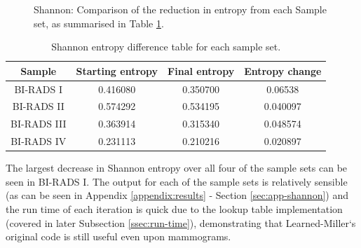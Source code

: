 \begin{figure}[H]
  \begin{center}
    \caption{Shannon: Comparison of the reduction in entropy from each Sample set, as summarised in Table \ref{table:shannon-entropy}.}
    \label{fig:shannon-graph}
  \end{center}
\end{figure}

\begin{table}[H]
  \centering
  \begin{tabular}{| c  c  c   c |}
    \textbf{Sample} & \textbf{Starting entropy} & \textbf{Final entropy} & \textbf{Entropy change} \\ \hline
    BI-RADS I & 0.416080 & 0.350700 & 0.06538 \\ \hline
    BI-RADS II & 0.574292 & 0.534195 & 0.040097 \\ \hline
    BI-RADS III & 0.363914 & 0.315340 & 0.048574 \\ \hline
    BI-RADS IV & 0.231113 & 0.210216 & 0.020897 \\
  \end{tabular}
  \caption{Shannon entropy difference table for each sample set.}
  \label{table:shannon-entropy}
\end{table}

The largest decrease in Shannon entropy over all four of the sample sets can be seen in BI-RADS I. The output for each of the sample sets is relatively sensible (as can be seen in  Appendix \ref{appendix:results} - Section \ref{sec:app-shannon}) and the run time of each iteration is quick due to the lookup table implementation (covered in later Subsection \ref{ssec:run-time}), demonstrating that Learned-Miller`s original code is still useful even upon mammograms.

